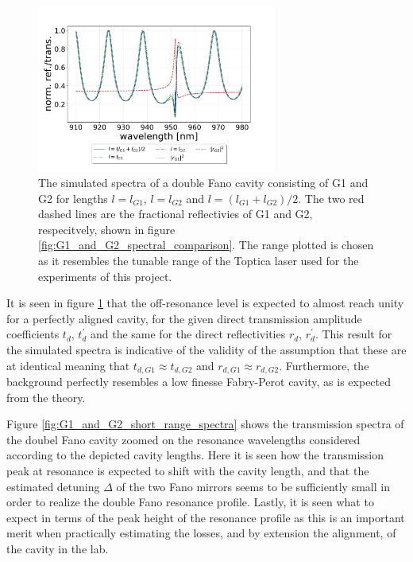 \begin{figure}[h!]
    \centering
    \includegraphics[width=0.7\textwidth]{figures/results/M3:M5/M3:M5_sim_spectra_long.pdf}
    \caption{The simulated spectra of a double Fano cavity consisting of G1 and G2 for lengths $l=l_{G1}$, $l=l_{G2}$ and $l = (l_{G1}+l_{G2})/2$. The two red dashed lines are the fractional reflectivies of G1 and G2, respecitvely, shown in figure \ref{fig:G1_and_G2_spectral_comparison}. The range plotted is chosen as it resembles the tunable range of the Toptica laser used for the experiments of this project.}
    \label{fig:G1_and_G2_full_range_spectra}
\end{figure}

It is seen in figure \ref{fig:G1_and_G2_full_range_spectra} that the off-resonance level is expected to almost reach unity for a perfectly aligned cavity, for the given direct transmission amplitude coefficients $t_d$, $t_d^{\prime}$ and the same for the direct reflectivities $r_d$, $r_d^{\prime}$. This result for the simulated spectra is indicative of the validity of the assumption that these are at identical meaning that $t_{d,G1} \approx t_{d,G2}$ and $r_{d,G1} \approx r_{d,G2}$. Furthermore, the background perfectly resembles a low finesse Fabry-Perot cavity, as is expected from the theory. 

Figure \ref{fig:G1_and_G2_short_range_spectra} shows the transmission spectra of the doubel Fano cavity zoomed on the resonance wavelengths considered according to the depicted cavity lengths. Here it is seen how the transmission peak at resonance is expected to shift with the cavity length, and that the estimated detuning $\Delta$ of the two Fano mirrors seems to be sufficiently small in order to realize the double Fano resonance profile. Lastly, it is seen what to expect in terms of the peak height of the resonance profile as this is an important merit when practically estimating the losses, and by extension the alignment, of the cavity in the lab. 

